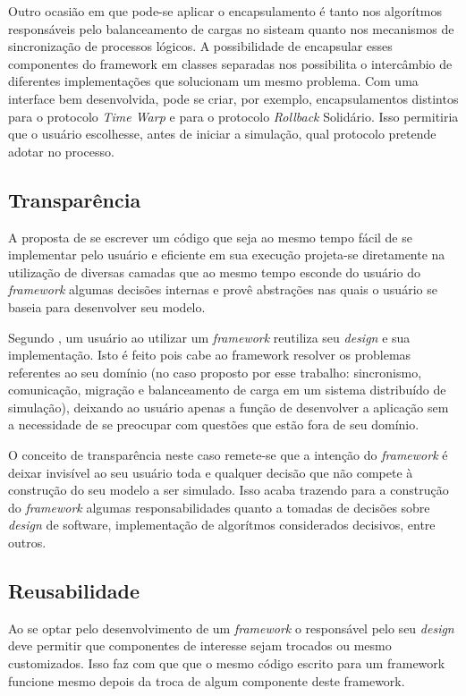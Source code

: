 Outro ocasião em que pode-se aplicar o encapsulamento é tanto nos algorítmos responsáveis pelo balanceamento de cargas no sisteam quanto nos mecanismos de sincronização de processos lógicos. A possibilidade de encapsular esses componentes do framework em classes separadas nos possibilita o intercâmbio de diferentes implementações que solucionam um mesmo problema. Com uma interface bem desenvolvida, pode se criar, por exemplo, encapsulamentos distintos para o protocolo \textit{Time Warp} e para o protocolo \textit{Rollback} Solidário. Isso permitiria que o usuário escolhesse, antes de iniciar a simulação, qual protocolo pretende adotar no processo.

\subsection{Transparência}

A proposta de se escrever um código que seja ao mesmo tempo fácil de se implementar pelo usuário e eficiente em sua execução projeta-se diretamente na utilização de diversas camadas que ao mesmo tempo esconde do usuário do \textit{framework} algumas decisões internas e provê abstrações nas quais o usuário se baseia para desenvolver seu modelo.

Segundo \cite{DIRK00}, um usuário ao utilizar um \textit{framework} reutiliza seu \textit{design} e sua implementação. Isto é feito pois cabe ao framework resolver os problemas referentes ao seu domínio (no caso proposto por esse trabalho: sincronismo, comunicação, migração e balanceamento de carga em um sistema distribuído de simulação), deixando ao usuário apenas a função de desenvolver a aplicação sem a necessidade de se preocupar com questões que estão fora de seu domínio.

O conceito de transparência neste caso remete-se que a intenção do \textit{framework} é deixar invisível ao seu usuário toda e qualquer decisão que não compete à construção do seu modelo a ser simulado. Isso acaba trazendo para a construção do \textit{framework} algumas responsabilidades quanto a tomadas de decisões sobre \textit{design} de software, implementação de algorítmos considerados decisivos, entre outros.

\subsection{Reusabilidade}

Ao se optar pelo desenvolvimento de um \textit{framework} o responsável pelo seu \textit{design} deve permitir que componentes de interesse sejam trocados ou mesmo customizados. Isso faz com que que o mesmo código escrito para um framework funcione mesmo depois da troca de algum componente deste framework.

